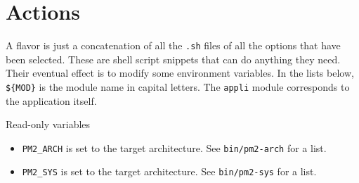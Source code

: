 \documentclass[11pt, a4paper ,twoside]{article}
\begin{document}
\section{Actions}

A flavor is just a concatenation of all the \verb+.sh+ files of all the
options that have been selected.  These are shell script snippets that
can do anything they need.  Their eventual effect is to modify some
environment variables.  In the lists below, \verb+${MOD}+ is the module
name in capital letters.  The \verb+appli+ module corresponds to 
the application itself.

Read-only variables
\begin{itemize}
\item \verb+PM2_ARCH+ is set to the target architecture. See
\verb+bin/pm2-arch+ for a list.
\item \verb+PM2_SYS+ is set to the target architecture. See
\verb+bin/pm2-sys+ for a list.
\end{itemize}
\end{document}
